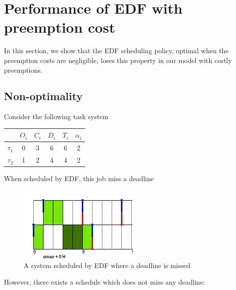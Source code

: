 \documentclass[a4paper,10pt]{article}
\begin{document}
\section{Performance of EDF with preemption cost}

    In this section, we show that the EDF scheduling policy, optimal when the preemption costs are negligible, loses this property in our model with costly preemptions.

    \subsection{Non-optimality}

        Consider the following task system

        \begin{center}
            \begin{tabular}{|r|c|c|c|c|c|}
                \hline
                            & $O_i$ & $C_i$ & $D_i$ & $T_i$ & $\alpha_i$ \\ \hline
                $\tau_1$    & 0     & 3     & 6    & 6     & 2     \\ \hline
                $\tau_2$    & 1     & 2     & 4    & 4     & 2     \\ \hline
            \end{tabular}
        \end{center}

        When scheduled by EDF, this job miss a deadline\\

        \begin{figure}[H]
        \begin{center}
            \includegraphics{figs/edfNonOptimal_EDF.png}
            \caption{A system scheduled by EDF where a deadline is missed}
            \label{fig:edfnonoptimal_edf}
        \end{center}
        \end{figure}

        However, there exists a schedule which does not miss any deadline:\\
\end{document}
